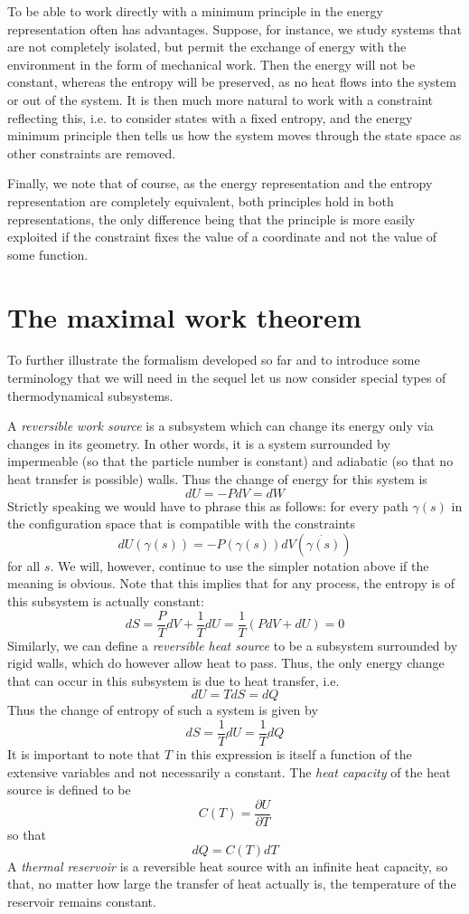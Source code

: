 \documentclass[a4paper, draft]{report}
\numberwithin{section}{chapter}
\numberwithin{equation}{chapter}
\theoremstyle{own}
\theoremstyle{remark}
\begin{document}
To be able to work directly with a minimum principle in the energy representation often has advantages. Suppose, for instance, we study systems that are not completely isolated, but permit the exchange of energy with the environment in the form of mechanical work. Then the energy will not be constant, whereas the entropy will be preserved, as no heat flows into the system or out of the system. It is then much more natural to work with a constraint reflecting this, i.e. to consider states with a fixed entropy, and the energy minimum principle then tells us how the system moves through the state space as other constraints are removed.

Finally, we note that of course, as the energy representation and the entropy representation are completely equivalent, both principles hold in both representations, the only difference being that the principle is more easily exploited if the constraint fixes the value of a coordinate and not the value of some function.


\section{The maximal work theorem}

To further illustrate the formalism developed so far and to introduce some terminology that we will need in the sequel let us now consider special types of thermodynamical subsystems. 

A {\em reversible work source} is a subsystem which can change its energy only via changes in its geometry. In other words, it is a system surrounded by impermeable (so that the particle number is constant) and adiabatic (so that no heat transfer is possible) walls. Thus the change of energy for this system is
$$
dU = - P dV = dW
$$
Strictly speaking we would have to phrase this as follows: for every path $\gamma(s)$ in the configuration space that is compatible with the constraints
$$
dU(\gamma(s)) = - P(\gamma(s)) dV(\dot{\gamma(s)})
$$
for all $s$. We will, however, continue to use the simpler notation above if the meaning is obvious. Note that this implies that for any process, the entropy is of this subsystem is actually constant:
$$
dS = \frac{P}{T} dV + \frac{1}{T} dU = \frac{1}{T} (P dV + dU) = 0
$$
Similarly, we can define a {\em reversible heat source} to be a subsystem surrounded by rigid walls, which do however allow heat to pass. Thus, the only energy change that can occur in this subsystem is due to heat transfer, i.e.
$$
dU = T dS = dQ
$$
Thus the change of entropy of such a system is given by
$$
dS = \frac{1}{T} dU = \frac{1}{T} dQ
$$
It is important to note that $T$ in this expression is itself a function of the extensive variables and not necessarily a constant. The {\em heat capacity} of the heat source is defined to be
$$
C(T) = \frac{\partial U}{\partial T}
$$
so that
$$
dQ = C(T) dT
$$
A {\em thermal reservoir} is a reversible heat source with an infinite heat capacity, so that, no matter how large the transfer of heat actually is, the temperature of the reservoir remains constant.
\end{document}
